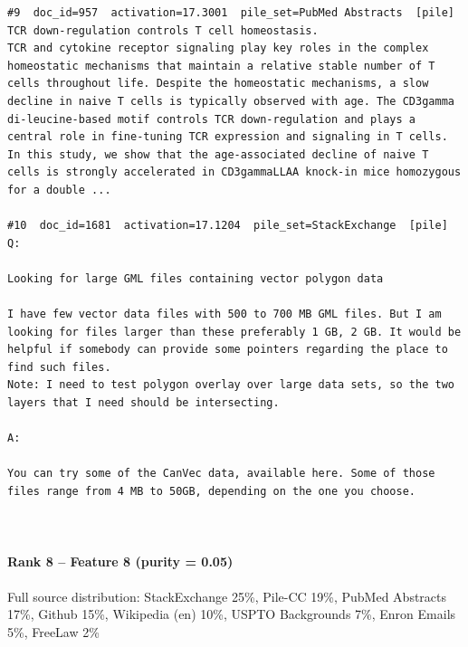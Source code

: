 \begin{verbatim}
#9  doc_id=957  activation=17.3001  pile_set=PubMed Abstracts  [pile]
TCR down-regulation controls T cell homeostasis.
TCR and cytokine receptor signaling play key roles in the complex homeostatic mechanisms that maintain a relative stable number of T cells throughout life. Despite the homeostatic mechanisms, a slow decline in naive T cells is typically observed with age. The CD3gamma di-leucine-based motif controls TCR down-regulation and plays a central role in fine-tuning TCR expression and signaling in T cells. In this study, we show that the age-associated decline of naive T cells is strongly accelerated in CD3gammaLLAA knock-in mice homozygous for a double ...

#10  doc_id=1681  activation=17.1204  pile_set=StackExchange  [pile]
Q:

Looking for large GML files containing vector polygon data

I have few vector data files with 500 to 700 MB GML files. But I am looking for files larger than these preferably 1 GB, 2 GB. It would be helpful if somebody can provide some pointers regarding the place to find such files.
Note: I need to test polygon overlay over large data sets, so the two layers that I need should be intersecting.

A:

You can try some of the CanVec data, available here. Some of those files range from 4 MB to 50GB, depending on the one you choose.



\end{verbatim}

\paragraph*{Rank 8 -- Feature 8 (purity = 0.05)}

Full source distribution: StackExchange 25\%, Pile-CC 19\%, PubMed Abstracts 17\%, Github 15\%, Wikipedia (en) 10\%, USPTO Backgrounds 7\%, Enron Emails 5\%, FreeLaw 2\%

